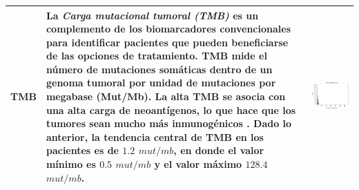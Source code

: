 \begin{table}[!htb]
	\footnotesize
	\begin{threeparttable}
		\begin{tabular}{p{2.5cm} p{7cm} p{6.5cm}} \toprule	
			
			TMB
			& La \textit{Carga mutacional tumoral (TMB)} es un complemento de los biomarcadores convencionales para identificar pacientes que pueden beneficiarse de las opciones de tratamiento. TMB mide el número de mutaciones somáticas dentro de un genoma tumoral por unidad de mutaciones por megabase (Mut/Mb). La alta TMB se asocia con una alta carga de neoantígenos, lo que hace que los tumores sean mucho más inmunogénicos \cite{Ke2022}. Dado lo anterior, la tendencia central de TMB en los pacientes es de $1.2$ $mut/mb$, en donde el valor mínimo es $0.5$ $mut/mb$ y el valor máximo $128.4$ $mut/mb$.
			
			& \begin{center}\includegraphics[width=1\linewidth]{NOTEBOOK/IMAGENES_DESCRIPTIVAS/42_tmb_nonsynonymous}\end{center}
			\\ \hline
			

\end{tabular}
\end{threeparttable}
\end{table}

